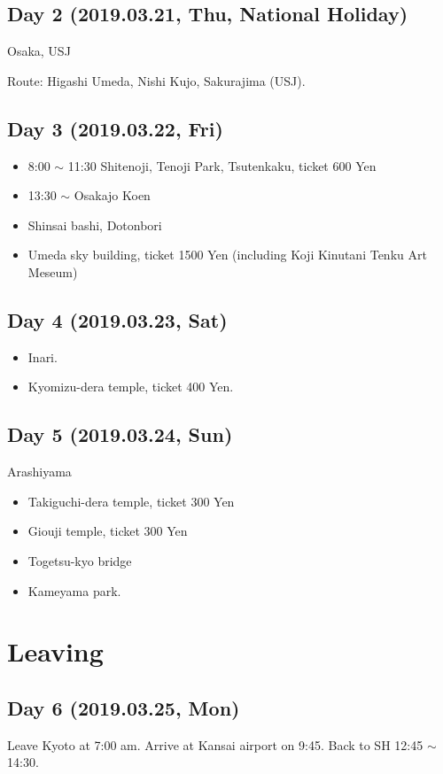 \documentclass{article}
\begin{document}

\subsection{Day 2 (2019.03.21, Thu, National Holiday)}
Osaka, USJ

Route: Higashi Umeda, Nishi Kujo, Sakurajima (USJ).

\subsection{Day 3 (2019.03.22, Fri)}
\begin{itemize}
\item 8:00 $\sim$ 11:30 Shitenoji, Tenoji Park, Tsutenkaku, ticket 600 Yen
\item 13:30 $\sim$ Osakajo Koen
\item Shinsai bashi, Dotonbori
\item Umeda sky building, ticket 1500 Yen (including Koji Kinutani Tenku Art Meseum)
\end{itemize}

\subsection{Day 4 (2019.03.23, Sat)}
\begin{itemize}
\item Inari.
\item Kyomizu-dera temple, ticket 400 Yen.
\end{itemize}

\subsection{Day 5 (2019.03.24, Sun)}
Arashiyama
\begin{itemize}
\item Takiguchi-dera temple, ticket 300 Yen
\item Giouji temple, ticket 300 Yen
\item Togetsu-kyo bridge
\item Kameyama park.
\end{itemize}

\section{Leaving}
\subsection{Day 6 (2019.03.25, Mon)}
Leave Kyoto at 7:00 am.
Arrive at Kansai airport on 9:45.
Back to SH 12:45 $\sim $ 14:30.
\end{document}
